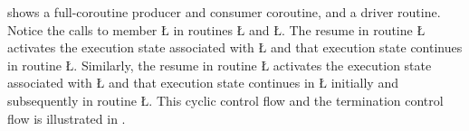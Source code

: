 \documentclass[openright,twoside]{report}
\begin{document}
 shows a full-coroutine producer and consumer coroutine, and a driver routine.
Notice the calls to member \LGinlinetrue\LGbegin\lgrinde\L{}\endlgrinde\LGend{} in routines \LGinlinetrue\LGbegin\lgrinde\L{}\endlgrinde\LGend{} and \LGinlinetrue\LGbegin\lgrinde\L{}\endlgrinde\LGend{}.
The resume in routine \LGinlinetrue\LGbegin\lgrinde\L{}\endlgrinde\LGend{} activates the execution state associated with \LGinlinetrue\LGbegin\lgrinde\L{}\endlgrinde\LGend{} and that execution state continues in routine \LGinlinetrue\LGbegin\lgrinde\L{}\endlgrinde\LGend{}.
Similarly, the resume in routine \LGinlinetrue\LGbegin\lgrinde\L{}\endlgrinde\LGend{} activates the execution state associated with \LGinlinetrue\LGbegin\lgrinde\L{}\endlgrinde\LGend{} and that execution state continues in \LGinlinetrue\LGbegin\lgrinde\L{}\endlgrinde\LGend{} initially and subsequently in routine \LGinlinetrue\LGbegin\lgrinde\L{}\endlgrinde\LGend{}.
This cyclic control flow and the termination control flow is illustrated in .
\end{document}
